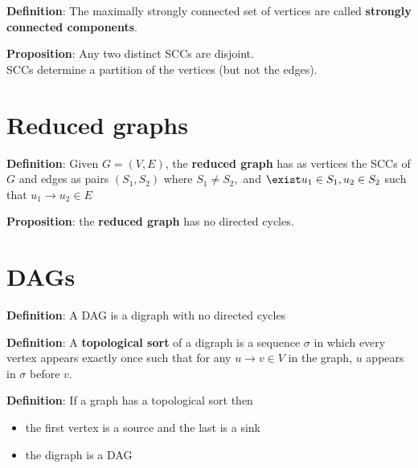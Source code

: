 \begin{framed}
   \textbf{Definition}: The maximally strongly connected set of vertices are called \textbf{strongly connected components}. 
\end{framed}

\begin{framed}
   \textbf{Proposition}: Any two distinct SCCs are disjoint.  \\

  SCCs determine a partition of the vertices (but not the edges).  
\end{framed}

\section{Reduced graphs}
\begin{framed}
   \textbf{Definition}: Given $G = (V, E)$, the \textbf{reduced graph} has as vertices the SCCs of $G$ and edges as pairs $(S_1, S_2) $ where $S_1 \neq S_2, $ and $\exist u_1 \in S_1, u_2 \in S_2$ such that $u_1 \rightarrow u_2 \in E$
\end{framed}

\begin{framed}
   \textbf{Proposition}: the \textbf{reduced graph} has no directed cycles. 
\end{framed}

\section{DAGs}
\begin{framed}
   \textbf{Definition}: A DAG is a digraph with no directed cycles
\end{framed}

\begin{framed}
   \textbf{Definition}: A \textbf{topological sort} of a digraph is a sequence $\sigma$ in which every vertex appears exactly once such that for any $u \rightarrow v \in V$ in the graph,  $u$ appears in $\sigma$ before  $v$. 
\end{framed}

\begin{framed}
   \textbf{Definition}: If a graph has a topological sort then
   \begin{itemize}
      \item the first vertex is a source and the last is a sink 
      \item the digraph is a DAG
   \end{itemize}
\end{framed}

